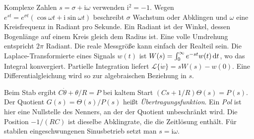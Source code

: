 Komplexe Zahlen \(s=\sigma+\mathrm i\omega\) verwenden \(\mathrm i^2=-1\). Wegen \(e^{st}=e^{\sigma t}(\cos\omega t+\mathrm i\sin\omega t)\) beschreibt \(\sigma\) Wachstum oder Abklingen und \(\omega\) eine Kreisfrequenz in Radiant pro Sekunde. Ein Radiant ist der Winkel, dessen Bogenlänge auf einem Kreis gleich dem Radius ist. Eine volle Umdrehung entspricht \(2\pi\) Radiant. Die reale Messgröße kann einfach der Realteil sein.
Die Laplace-Transformierte eines Signals \(w(t)\) ist \(W(s)=\int_0^\infty e^{-st}w(t)\,\mathrm{d} t\), wo das Integral konvergiert. Partielle Integration liefert \(\mathcal L\{\dot w\}=sW(s)-w(0)\). Eine Differentialgleichung wird so zur algebraischen Beziehung in \(s\).

Beim Stab ergibt \(C\dot\theta+\theta/R=P\) bei kaltem Start \((Cs+1/R)\Theta(s)=P(s)\). Der Quotient \(G(s)=\Theta(s)/P(s)\) heißt \emph{Übertragungsfunktion}. Ein \emph{Pol} ist hier eine Nullstelle des Nenners, an der der Quotient unbeschränkt wird. Die Position \(-1/(RC)\) ist dieselbe Abklingrate, die die Zeitlösung enthält. Für stabilen eingeschwungenen Sinusbetrieb setzt man \(s=\mathrm i\omega\).

